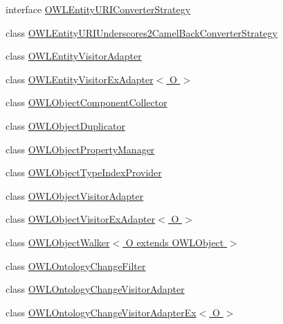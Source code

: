 \begin{DoxyCompactItemize}
\item 
interface \hyperlink{interfaceorg_1_1semanticweb_1_1owlapi_1_1util_1_1_o_w_l_entity_u_r_i_converter_strategy}{O\-W\-L\-Entity\-U\-R\-I\-Converter\-Strategy}
\item 
class \hyperlink{classorg_1_1semanticweb_1_1owlapi_1_1util_1_1_o_w_l_entity_u_r_i_underscores2_camel_back_converter_strategy}{O\-W\-L\-Entity\-U\-R\-I\-Underscores2\-Camel\-Back\-Converter\-Strategy}
\item 
class \hyperlink{classorg_1_1semanticweb_1_1owlapi_1_1util_1_1_o_w_l_entity_visitor_adapter}{O\-W\-L\-Entity\-Visitor\-Adapter}
\item 
class \hyperlink{classorg_1_1semanticweb_1_1owlapi_1_1util_1_1_o_w_l_entity_visitor_ex_adapter_3_01_o_01_4}{O\-W\-L\-Entity\-Visitor\-Ex\-Adapter$<$ O $>$}
\item 
class \hyperlink{classorg_1_1semanticweb_1_1owlapi_1_1util_1_1_o_w_l_object_component_collector}{O\-W\-L\-Object\-Component\-Collector}
\item 
class \hyperlink{classorg_1_1semanticweb_1_1owlapi_1_1util_1_1_o_w_l_object_duplicator}{O\-W\-L\-Object\-Duplicator}
\item 
class \hyperlink{classorg_1_1semanticweb_1_1owlapi_1_1util_1_1_o_w_l_object_property_manager}{O\-W\-L\-Object\-Property\-Manager}
\item 
class \hyperlink{classorg_1_1semanticweb_1_1owlapi_1_1util_1_1_o_w_l_object_type_index_provider}{O\-W\-L\-Object\-Type\-Index\-Provider}
\item 
class \hyperlink{classorg_1_1semanticweb_1_1owlapi_1_1util_1_1_o_w_l_object_visitor_adapter}{O\-W\-L\-Object\-Visitor\-Adapter}
\item 
class \hyperlink{classorg_1_1semanticweb_1_1owlapi_1_1util_1_1_o_w_l_object_visitor_ex_adapter_3_01_o_01_4}{O\-W\-L\-Object\-Visitor\-Ex\-Adapter$<$ O $>$}
\item 
class \hyperlink{classorg_1_1semanticweb_1_1owlapi_1_1util_1_1_o_w_l_object_walker_3_01_o_01extends_01_o_w_l_object_01_4}{O\-W\-L\-Object\-Walker$<$ O extends O\-W\-L\-Object $>$}
\item 
class \hyperlink{classorg_1_1semanticweb_1_1owlapi_1_1util_1_1_o_w_l_ontology_change_filter}{O\-W\-L\-Ontology\-Change\-Filter}
\item 
class \hyperlink{classorg_1_1semanticweb_1_1owlapi_1_1util_1_1_o_w_l_ontology_change_visitor_adapter}{O\-W\-L\-Ontology\-Change\-Visitor\-Adapter}
\item 
class \hyperlink{classorg_1_1semanticweb_1_1owlapi_1_1util_1_1_o_w_l_ontology_change_visitor_adapter_ex_3_01_o_01_4}{O\-W\-L\-Ontology\-Change\-Visitor\-Adapter\-Ex$<$ O $>$}

\end{DoxyCompactItemize}
